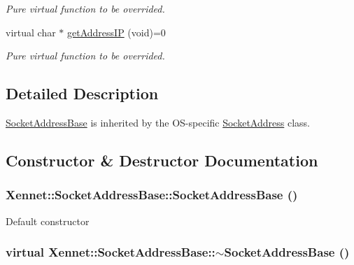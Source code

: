 \begin{CompactItemize}
\begin{CompactList}\small\item\em Pure virtual function to be overrided. \item\end{CompactList}\item 
virtual char $\ast$ \hyperlink{classXennet_1_1SocketAddressBase_00ae0b9d74b1634167567fd79ba708d1}{getAddressIP} (void)=0
\begin{CompactList}\small\item\em Pure virtual function to be overrided. \item\end{CompactList}\end{CompactItemize}


\subsection{Detailed Description}
\hyperlink{classXennet_1_1SocketAddressBase}{SocketAddressBase} is inherited by the OS-specific \hyperlink{classXennet_1_1SocketAddress}{SocketAddress} class. 

\subsection{Constructor \& Destructor Documentation}
\hypertarget{classXennet_1_1SocketAddressBase_7c425dc33914559b83e0a30916aacd46}{
\subsubsection{\setlength{\rightskip}{0pt plus 5cm}Xennet::SocketAddressBase::SocketAddressBase ()}}
\label{classXennet_1_1SocketAddressBase_7c425dc33914559b83e0a30916aacd46}


Default constructor \hypertarget{classXennet_1_1SocketAddressBase_97756e2c34324d84ed2f656e3f941fa1}{
\subsubsection{\setlength{\rightskip}{0pt plus 5cm}virtual Xennet::SocketAddressBase::$\sim$SocketAddressBase ()}}
\label{classXennet_1_1SocketAddressBase_97756e2c34324d84ed2f656e3f941fa1}


